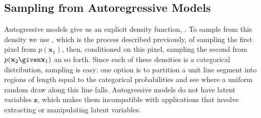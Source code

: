 \subsection{Sampling from Autoregressive Models}
Autogressive models give us an explicit density function, \eqn{\ref{eqn:generative_models:autoregressive_likelihood}}. To sample from this density we use , which is the process described previously, of sampling the first pixel from $p(\mathbf{x}_1)$, then, conditioned on this pixel, sampling the second from $p(\mathbf{x}_2 \given \mathbf{x}_1)$ an so forth. Since each of these densities is a categorical distribution, sampling is easy: one option is to partition a unit line segment into regions of length equal to the categorical probabilities and see where a uniform random draw along this line falls. Autogressive models do not have latent variables $\mathbf{z}$, which makes them incompatible with applications that involve extracting or manipulating latent variables.





